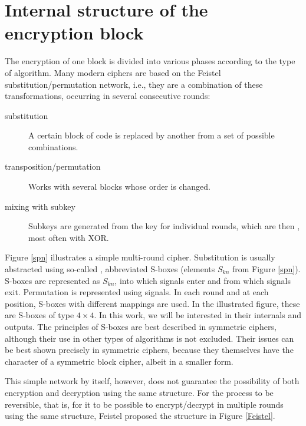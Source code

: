 \pagebreak %

\section{Internal structure of the encryption block}
The encryption of one block is divided into various phases according to the type of algorithm.
Many modern ciphers are based on the Feistel substitution/permutation network,
i.e., they are a combination of these transformations, occurring in several consecutive rounds:
\begin{description}
  \item[substitution] A certain block of code is replaced by another from a set of possible combinations.
  \item[transposition/permutation] Works with several blocks whose order is changed.
  \item[mixing with subkey] Subkeys are generated from the key for individual rounds,
  which are then , most often with XOR.
\end{description}
Figure \ref{spn} illustrates a simple multi-round
cipher.
Substitution is usually abstracted using so-called , abbreviated S-boxes
(elements $S_{kn}$ from Figure \ref{spn}). S-boxes are represented as
 $S_{kn}$, into which signals enter
and from which signals exit.
Permutation is represented using signals.
In each round
and at each position, S-boxes with different mappings are used.
In the illustrated figure, these are S-boxes of type $4 \times 4$.
In this work, we will be interested in their internals and outputs.
The principles of S-boxes are best described in symmetric ciphers, although their use
in other types of algorithms is not excluded.
Their issues can be best shown precisely in symmetric ciphers, because
they themselves have the character of a symmetric block cipher, albeit in a smaller form.

This simple network by itself, however, does not guarantee the possibility of both encryption and decryption using
the same structure. For the process to be reversible, that is, for it to be possible to encrypt/decrypt
in multiple rounds using the same structure,
Feistel \cite{wikiFeistel} proposed the structure in Figure \ref{Feistel}.


